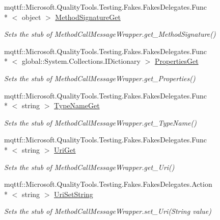 \begin{DoxyCompactItemize}
mqttf\-::\-Microsoft.\-Quality\-Tools.\-Testing.\-Fakes.\-Fakes\-Delegates.\-Func\\*
$<$ object $>$ \hyperlink{class_system_1_1_runtime_1_1_remoting_1_1_messaging_1_1_fakes_1_1_stub_method_call_message_wrapper_a905ea4c225b5828913045813f6ba12b3}{Method\-Signature\-Get}
\begin{DoxyCompactList}\small\item\em Sets the stub of Method\-Call\-Message\-Wrapper.\-get\-\_\-\-Method\-Signature()\end{DoxyCompactList}\item 
mqttf\-::\-Microsoft.\-Quality\-Tools.\-Testing.\-Fakes.\-Fakes\-Delegates.\-Func\\*
$<$ global\-::\-System.\-Collections.\-I\-Dictionary $>$ \hyperlink{class_system_1_1_runtime_1_1_remoting_1_1_messaging_1_1_fakes_1_1_stub_method_call_message_wrapper_a22798e06a75f0bebec87e794a61bdaff}{Properties\-Get}
\begin{DoxyCompactList}\small\item\em Sets the stub of Method\-Call\-Message\-Wrapper.\-get\-\_\-\-Properties()\end{DoxyCompactList}\item 
mqttf\-::\-Microsoft.\-Quality\-Tools.\-Testing.\-Fakes.\-Fakes\-Delegates.\-Func\\*
$<$ string $>$ \hyperlink{class_system_1_1_runtime_1_1_remoting_1_1_messaging_1_1_fakes_1_1_stub_method_call_message_wrapper_a0831eef50d30eb4e6f489eafd13d0e81}{Type\-Name\-Get}
\begin{DoxyCompactList}\small\item\em Sets the stub of Method\-Call\-Message\-Wrapper.\-get\-\_\-\-Type\-Name()\end{DoxyCompactList}\item 
mqttf\-::\-Microsoft.\-Quality\-Tools.\-Testing.\-Fakes.\-Fakes\-Delegates.\-Func\\*
$<$ string $>$ \hyperlink{class_system_1_1_runtime_1_1_remoting_1_1_messaging_1_1_fakes_1_1_stub_method_call_message_wrapper_aaf6e3de6a55866adf306f401a9715730}{Uri\-Get}
\begin{DoxyCompactList}\small\item\em Sets the stub of Method\-Call\-Message\-Wrapper.\-get\-\_\-\-Uri()\end{DoxyCompactList}\item 
mqttf\-::\-Microsoft.\-Quality\-Tools.\-Testing.\-Fakes.\-Fakes\-Delegates.\-Action\\*
$<$ string $>$ \hyperlink{class_system_1_1_runtime_1_1_remoting_1_1_messaging_1_1_fakes_1_1_stub_method_call_message_wrapper_ab396a1a1143cffc37943d706680f15b0}{Uri\-Set\-String}
\begin{DoxyCompactList}\small\item\em Sets the stub of Method\-Call\-Message\-Wrapper.\-set\-\_\-\-Uri(\-String value)\end{DoxyCompactList}\end{DoxyCompactItemize}

